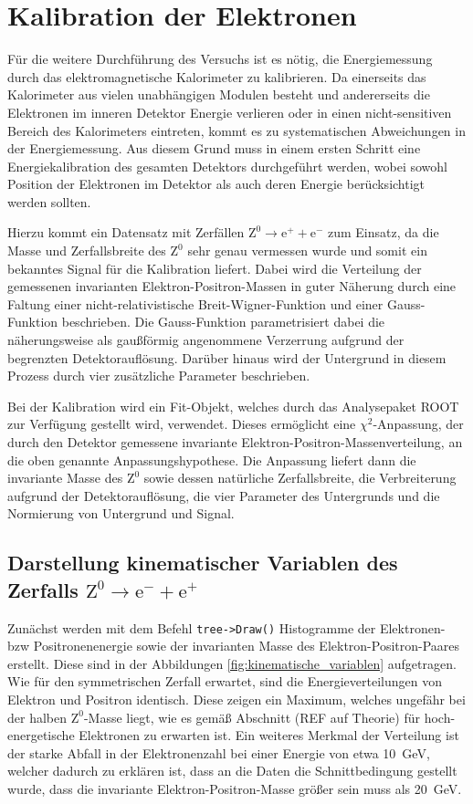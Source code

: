 \documentclass[11pt, a4paper]{article}
\numberwithin{equation}{section}
\newcommand{\korr}[1]{{\color{red}(#1)}}
\begin{document}
\section{Kalibration der Elektronen}

Für die weitere Durchführung des Versuchs ist es nötig, die Energiemessung durch das elektromagnetische Kalorimeter zu kalibrieren.
Da einerseits das Kalorimeter aus vielen unabhängigen Modulen besteht und andererseits die Elektronen im inneren Detektor Energie verlieren oder in einen nicht-sensitiven Bereich des Kalorimeters eintreten, kommt es zu systematischen Abweichungen in der Energiemessung.
Aus diesem Grund muss in einem ersten Schritt eine Energiekalibration des gesamten Detektors durchgeführt werden, wobei sowohl Position der Elektronen im Detektor als auch deren Energie berücksichtigt werden sollten.

Hierzu kommt ein Datensatz mit Zerfällen $\mathrm{Z}^0 \rightarrow \mathrm{e}^+ + \mathrm{e}^-$ zum Einsatz, da die Masse und Zerfallsbreite des $\mathrm{Z}^0$ sehr genau vermessen wurde und somit ein bekanntes Signal für die Kalibration liefert.
Dabei wird die Verteilung der gemessenen invarianten Elektron-Positron-Massen in guter Näherung durch eine Faltung einer nicht-relativistische Breit-Wigner-Funktion und einer Gauss-Funktion beschrieben.
Die Gauss-Funktion parametrisiert dabei die näherungsweise als gaußförmig angenommene Verzerrung aufgrund der begrenzten Detektorauflösung.
Darüber hinaus wird der Untergrund in diesem Prozess durch vier zusätzliche Parameter beschrieben.

Bei der Kalibration wird ein Fit-Objekt, welches durch das Analysepaket ROOT zur Verfügung gestellt wird, verwendet.
Dieses ermöglicht eine $\chi^2$-Anpassung, der durch den Detektor gemessene invariante Elektron-Positron-Massenverteilung, an die oben genannte Anpassungshypothese.
Die Anpassung liefert dann die invariante Masse des $\mathrm{Z}^0$ sowie dessen natürliche Zerfallsbreite, die Verbreiterung aufgrund der Detektorauflösung, die vier Parameter des Untergrunds und die Normierung von Untergrund und Signal.

\subsection{Darstellung kinematischer Variablen des Zerfalls $\mathrm{Z}^0 \rightarrow \mathrm{e}^- + \mathrm{e}^+$}

Zunächst werden mit dem Befehl \texttt{tree->Draw()} Histogramme der Elektronen- bzw Positronenenergie sowie der invarianten Masse des Elektron-Positron-Paares erstellt.
Diese sind in der Abbildungen \ref{fig:kinematische_variablen} aufgetragen.
Wie für den symmetrischen Zerfall erwartet, sind die Energieverteilungen von Elektron und Positron identisch.
Diese zeigen ein Maximum, welches ungefähr bei der halben $\mathrm{Z}^0$-Masse liegt, wie es gemäß Abschnitt \korr{REF auf Theorie} für hoch-energetische Elektronen zu erwarten ist.
Ein weiteres Merkmal der Verteilung ist der starke Abfall in der Elektronenzahl bei einer Energie von etwa \SI{10}{\GeV}, welcher dadurch zu erklären ist, dass an die Daten die Schnittbedingung gestellt wurde, dass die invariante Elektron-Positron-Masse größer sein muss als \SI{20}{\GeV}.
\end{document}
